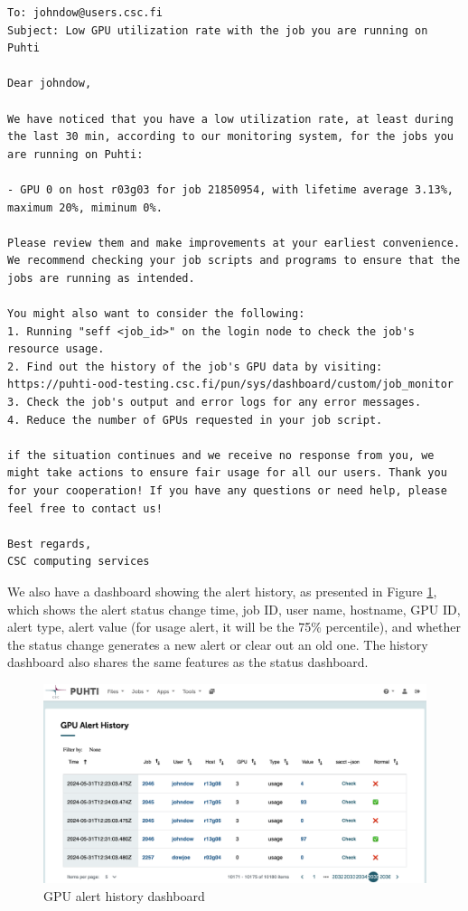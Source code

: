 \begin{verbatim}
To: johndow@users.csc.fi
Subject: Low GPU utilization rate with the job you are running on Puhti

Dear johndow,

We have noticed that you have a low utilization rate, at least during the last 30 min, according to our monitoring system, for the jobs you are running on Puhti:

- GPU 0 on host r03g03 for job 21850954, with lifetime average 3.13%, maximum 20%, miminum 0%.

Please review them and make improvements at your earliest convenience. We recommend checking your job scripts and programs to ensure that the jobs are running as intended.

You might also want to consider the following:
1. Running "seff <job_id>" on the login node to check the job's resource usage.
2. Find out the history of the job's GPU data by visiting: https://puhti-ood-testing.csc.fi/pun/sys/dashboard/custom/job_monitor
3. Check the job's output and error logs for any error messages.
4. Reduce the number of GPUs requested in your job script.

if the situation continues and we receive no response from you, we might take actions to ensure fair usage for all our users. Thank you for your cooperation! If you have any questions or need help, please feel free to contact us!

Best regards,
CSC computing services
\end{verbatim}

We also have a dashboard showing the alert history, as presented in Figure \ref{fig_history_dashboard}, which shows the alert status change time, job ID, user name, hostname, GPU ID, alert type, alert value (for usage alert, it will be the 75\% percentile), and whether the status change generates a new alert or clear out an old one. The history dashboard also shares the same features as the status dashboard.

\begin{figure}[H]
    \centering
    \includegraphics[width=1.1\textwidth]{figures/history-dashboard.png}
    \caption{GPU alert history dashboard}
    \label{fig_history_dashboard}
\end{figure}
